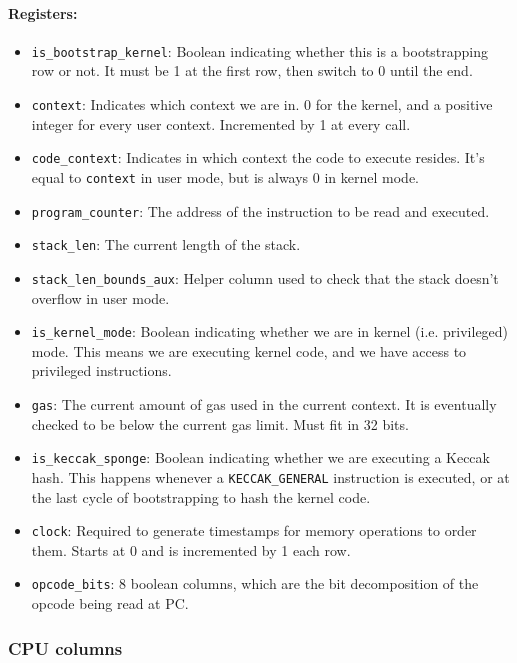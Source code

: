 \paragraph*{Registers:} \begin{itemize}
    \item \texttt{is\_bootstrap\_kernel}: Boolean indicating whether this is a bootstrapping row or not. It must be 1 at the first row, then switch to 0 until the end.
    \item \texttt{context}: Indicates which context we are in. 0 for the kernel, and a positive integer for every user context. Incremented by 1 at every call.
    \item \texttt{code\_context}: Indicates in which context the code to execute resides. It's equal to \texttt{context} in user mode, but is always 0 in kernel mode.
    \item \texttt{program\_counter}: The address of the instruction to be read and executed.
    \item \texttt{stack\_len}: The current length of the stack.
    \item \texttt{stack\_len\_bounds\_aux}: Helper column used to check that the stack doesn't overflow in user mode.
    \item \texttt{is\_kernel\_mode}: Boolean indicating whether we are in kernel (i.e. privileged) mode. This means we are executing kernel code, and we have access to
privileged instructions.
    \item \texttt{gas}: The current amount of gas used in the current context. It is eventually checked to be below the current gas limit. Must fit in 32 bits.
    \item \texttt{is\_keccak\_sponge}: Boolean indicating whether we are executing a Keccak hash. This happens whenever a \texttt{KECCAK\_GENERAL} instruction is executed, or at the last
cycle of bootstrapping to hash the kernel code.
    \item \texttt{clock}: Required to generate timestamps for memory operations to order them. Starts at 0 and is incremented by 1 each row.
    \item \texttt{opcode\_bits}: 8 boolean columns, which are the bit decomposition of the opcode being read at PC.
\end{itemize}

\subsubsection{CPU columns}

